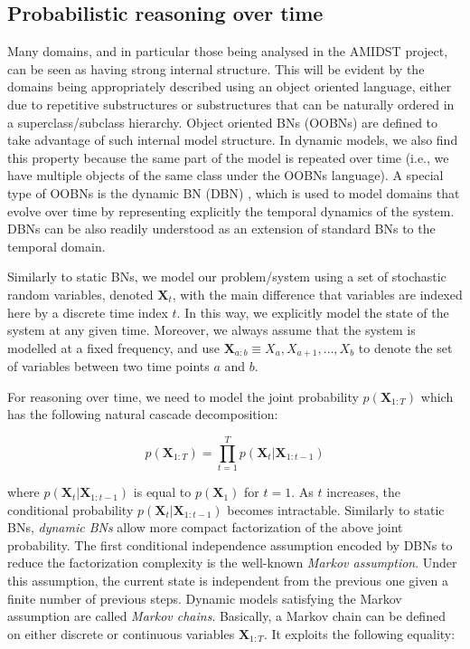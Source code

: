 \subsection{Probabilistic reasoning over time}\label{SubSection:DBNs}

Many domains, and in particular those being analysed in the AMIDST project, can be seen as having strong internal structure. This will be evident by the domains being appropriately described using an object oriented language, either due to repetitive substructures or substructures that can be naturally ordered in a superclass/subclass hierarchy.  Object oriented BNs \cite{KollerPfeffer1997} (OOBNs) are defined to take advantage of such internal model structure. In dynamic models, we also find this property because the same part of the model is repeated over time (i.e., we have multiple objects of the same class under the OOBNs language). A special type of OOBNs is the dynamic BN (DBN) \cite{DeanKanazawa1989}, which is used to model domains that evolve over time by representing explicitly the temporal dynamics of the system. DBNs can be also readily understood as an extension of standard BNs to the temporal domain. 

Similarly to static BNs, we model our problem/system using a set of stochastic random variables, denoted $\bm X_t$, with the main difference that variables are indexed here by a discrete time index $t$. In this way, we explicitly model the state of the system at any given time. Moreover, we always assume that the system is modelled at a fixed frequency, and use $\bm X_{a:b} \equiv X_a,X_{a+1},\ldots,X_{b}$ to denote the set of variables between two time points $a$ and $b$.  

For reasoning over time, we need to model the joint probability $p(\bm X_{1:T})$ which has the following natural cascade decomposition:

$$p(\bm X_{1:T})  = \prod_{t=1}^T p(\bm X_t|\bm X_{1:t-1})$$

\noindent where $p(\bm X_t|\bm X_{1:t-1})$ is equal to $p(\bm X_1)$ for $t=1$. As $t$ increases, the conditional probability $p(\bm X_t|\bm X_{1:t-1})$ becomes intractable. Similarly to static BNs, \textit{dynamic BNs} allow more compact factorization of the above joint probability. The first conditional independence assumption encoded by DBNs to reduce the factorization complexity is the well-known \textit{Markov assumption}. Under this assumption, the current state is independent from the previous one given a finite number of previous steps. Dynamic models satisfying the Markov assumption are called \textit{Markov chains}. Basically, a Markov chain can be defined on either discrete or continuous variables $\bm X_{1:T}$. It exploits the following equality:

